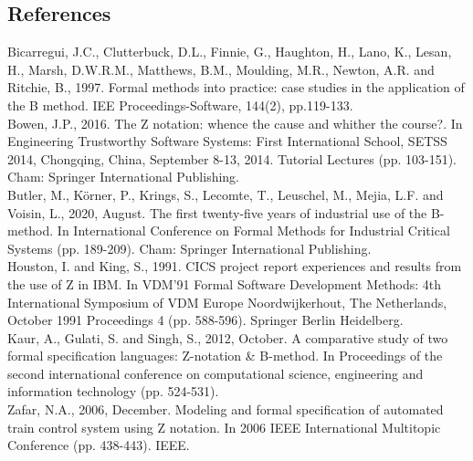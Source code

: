 \documentclass{article}
\begin{document}
\subsection*{References}

Bicarregui, J.C., Clutterbuck, D.L., Finnie, G., Haughton, H., Lano, K., Lesan, H., Marsh, D.W.R.M., Matthews, B.M., Moulding, M.R., Newton, A.R. and Ritchie, B., 1997. Formal methods into practice: case studies in the application of the B method. IEE Proceedings-Software, 144(2), pp.119-133. \\
\newline
Bowen, J.P., 2016. The Z notation: whence the cause and whither the course?. In Engineering Trustworthy Software Systems: First International School, SETSS 2014, Chongqing, China, September 8-13, 2014. Tutorial Lectures (pp. 103-151). Cham: Springer International Publishing. \\
\newline
Butler, M., Körner, P., Krings, S., Lecomte, T., Leuschel, M., Mejia, L.F. and Voisin, L., 2020, August. The first twenty-five years of industrial use of the B-method. In International Conference on Formal Methods for Industrial Critical Systems (pp. 189-209). Cham: Springer International Publishing. \\
\newline
Houston, I. and King, S., 1991. CICS project report experiences and results from the use of Z in IBM. In VDM'91 Formal Software Development Methods: 4th International Symposium of VDM Europe Noordwijkerhout, The Netherlands, October 1991 Proceedings 4 (pp. 588-596). Springer Berlin Heidelberg. \\
\newline
Kaur, A., Gulati, S. and Singh, S., 2012, October. A comparative study of two formal specification languages: Z-notation \& B-method. In Proceedings of the second international conference on computational science, engineering and information technology (pp. 524-531). \\
\newline
Zafar, N.A., 2006, December. Modeling and formal specification of automated train control system using Z notation. In 2006 IEEE International Multitopic Conference (pp. 438-443). IEEE. \\
\end{document}
